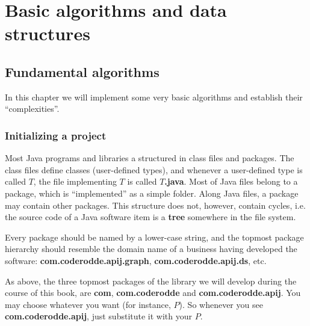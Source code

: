 \documentclass[oneside]{book}
\begin{document}
\part{Basic algorithms and data structures}  

\chapter{Fundamental algorithms}
In this chapter we will implement some very basic algorithms and establish their ``complexities''.

\section{Initializing a project}
Most Java programs and libraries a structured in class files and packages. The class files define classes (user-defined types), and whenever a user-defined type is called $T$, the file implementing $T$ is called $T$\textbf{.java}. Most of Java files belong to a package, which is ``implemented'' as a simple folder. Along Java files, a package may contain other packages. This structure does not, however, contain cycles, i.e. the source code of a Java software item is a \textbf{tree} somewhere in the file system. 

Every package should be named by a lower-case string, and the topmost package hierarchy should resemble the domain name of a business having developed the software: \textbf{com.coderodde.apij.graph}, \textbf{com.coderodde.apij.ds}, etc. 

As above, the three topmost packages of the library we will develop during the course of this book, are \textbf{com}, \textbf{com.coderodde} and \textbf{com.coderodde.apij}. You may choose whatever you want (for instance, $P$). So whenever you see \textbf{com.coderodde.apij}, just substitute it with your $P$.
\end{document}
